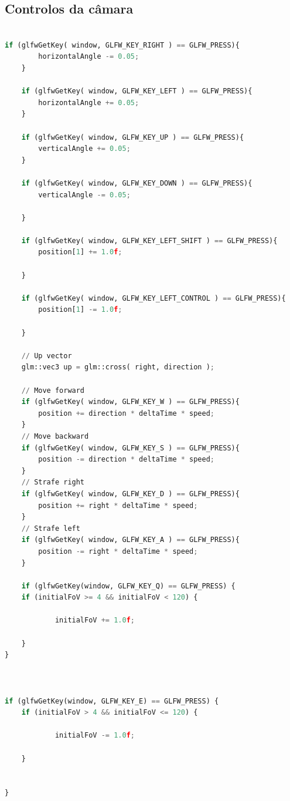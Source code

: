 \documentclass[12pt,a4paper]{memoir}
\begin{document}
    \subsection{Controlos da câmara}

\begin{lstlisting}[language=Python, caption=Função para desenhar a esfera]

if (glfwGetKey( window, GLFW_KEY_RIGHT ) == GLFW_PRESS){
		horizontalAngle -= 0.05;
	}

	if (glfwGetKey( window, GLFW_KEY_LEFT ) == GLFW_PRESS){
		horizontalAngle += 0.05;
	}

	if (glfwGetKey( window, GLFW_KEY_UP ) == GLFW_PRESS){
		verticalAngle += 0.05;
	}

	if (glfwGetKey( window, GLFW_KEY_DOWN ) == GLFW_PRESS){
		verticalAngle -= 0.05;

	}

	if (glfwGetKey( window, GLFW_KEY_LEFT_SHIFT ) == GLFW_PRESS){
		position[1] += 1.0f;

	}

	if (glfwGetKey( window, GLFW_KEY_LEFT_CONTROL ) == GLFW_PRESS){
		position[1] -= 1.0f;

	}
	
	// Up vector
	glm::vec3 up = glm::cross( right, direction );

	// Move forward
	if (glfwGetKey( window, GLFW_KEY_W ) == GLFW_PRESS){
		position += direction * deltaTime * speed;
	}
	// Move backward
	if (glfwGetKey( window, GLFW_KEY_S ) == GLFW_PRESS){
		position -= direction * deltaTime * speed;
	}
	// Strafe right
	if (glfwGetKey( window, GLFW_KEY_D ) == GLFW_PRESS){
		position += right * deltaTime * speed;
	}
	// Strafe left
	if (glfwGetKey( window, GLFW_KEY_A ) == GLFW_PRESS){
		position -= right * deltaTime * speed;
	}

	if (glfwGetKey(window, GLFW_KEY_Q) == GLFW_PRESS) {
    if (initialFoV >= 4 && initialFoV < 120) {

            initialFoV += 1.0f; 
        
    }
}



if (glfwGetKey(window, GLFW_KEY_E) == GLFW_PRESS) {
    if (initialFoV > 4 && initialFoV <= 120) {

            initialFoV -= 1.0f;
        
    }

 
}

\end{lstlisting}
\end{document}
